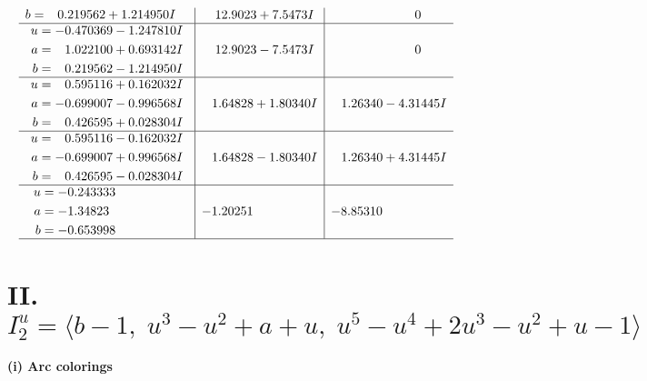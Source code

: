 \documentclass[1p]{elsarticle_modified}
\theoremstyle{definition}
\begin{document}
$$\begin{array}{c|c|c}
\begin{aligned}
b &= \phantom{-}0.219562 + 1.214950 I\end{aligned}
 & \phantom{-}12.9023 + 7.5473 I & \phantom{-0.000000 } 0 \\ \hline\begin{aligned}
u &= -0.470369 - 1.247810 I \\
a &= \phantom{-}1.022100 + 0.693142 I \\
b &= \phantom{-}0.219562 - 1.214950 I\end{aligned}
 & \phantom{-}12.9023 - 7.5473 I & \phantom{-0.000000 } 0 \\ \hline\begin{aligned}
u &= \phantom{-}0.595116 + 0.162032 I \\
a &= -0.699007 - 0.996568 I \\
b &= \phantom{-}0.426595 + 0.028304 I\end{aligned}
 & \phantom{-}1.64828 + 1.80340 I & \phantom{-}1.26340 - 4.31445 I \\ \hline\begin{aligned}
u &= \phantom{-}0.595116 - 0.162032 I \\
a &= -0.699007 + 0.996568 I \\
b &= \phantom{-}0.426595 - 0.028304 I\end{aligned}
 & \phantom{-}1.64828 - 1.80340 I & \phantom{-}1.26340 + 4.31445 I \\ \hline\begin{aligned}
u &= -0.243333\phantom{ +0.000000I} \\
a &= -1.34823\phantom{ +0.000000I} \\
b &= -0.653998\phantom{ +0.000000I}\end{aligned}
 & -1.20251\phantom{ +0.000000I} & -8.85310\phantom{ +0.000000I}\\
 \hline 
 \end{array}$$\newpage\newpage\renewcommand{\arraystretch}{1}
\centering \section*{II. $I^u_{2}= \langle b-1,\;u^3- u^2+a+u,\;u^5- u^4+2 u^3- u^2+u-1 \rangle$}
\flushleft \textbf{(i) Arc colorings}\\
\end{document}
